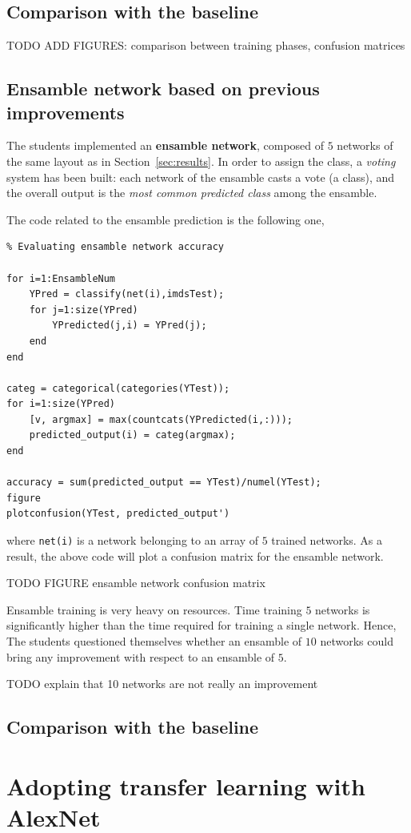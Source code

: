 \documentclass[a4paper, 11pt]{article} %
\begin{document}
\subsection{Comparison with the baseline}

TODO ADD FIGURES: comparison between training phases, confusion matrices

\subsection{Ensamble network based on previous improvements}

The students implemented an \textbf{ensamble network}, composed of $5$ networks of the same layout as in Section~\ref{sec:results}. In order to assign the class, a \emph{voting} system has been built: each network of the ensamble casts a vote (a class), and the overall output is the \emph{most common predicted class} among the ensamble.

The code related to the ensamble prediction is the following one,

\begin{lstlisting}
% Evaluating ensamble network accuracy

for i=1:EnsambleNum
    YPred = classify(net(i),imdsTest);
    for j=1:size(YPred)
        YPredicted(j,i) = YPred(j);
    end
end    

categ = categorical(categories(YTest));
for i=1:size(YPred)
    [v, argmax] = max(countcats(YPredicted(i,:)));
    predicted_output(i) = categ(argmax);
end

accuracy = sum(predicted_output == YTest)/numel(YTest);
figure
plotconfusion(YTest, predicted_output')
\end{lstlisting}

where \texttt{net(i)} is a network belonging to an array of $5$ trained networks. As a result, the above code will plot a confusion matrix for the ensamble network.

TODO FIGURE ensamble network confusion matrix

Ensamble training is very heavy on resources. Time training $5$ networks is significantly higher than the time required for training a single network. Hence, The students questioned themselves whether an ensamble of $10$ networks could bring any improvement with respect to an ensamble of $5$.

TODO explain that 10 networks are not really an improvement


\subsection{Comparison with the baseline}
 
\section{Adopting transfer learning with AlexNet}
\end{document}
